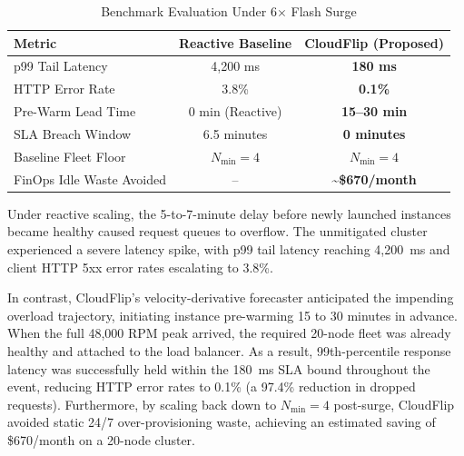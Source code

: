 \documentclass[10pt,journal,compsoc]{IEEEtran}
\begin{document}
\begin{table}[h]
\caption{Benchmark Evaluation Under 6$\times$ Flash Surge}
\label{tab:evaluation}
\centering
\begin{tabular}{lcc}
\toprule
\textbf{Metric} & \textbf{Reactive Baseline} & \textbf{CloudFlip (Proposed)} \\
\midrule
p99 Tail Latency & 4,200 ms & \textbf{180 ms} \\
HTTP Error Rate & 3.8\% & \textbf{0.1\%} \\
Pre-Warm Lead Time & 0 min (Reactive) & \textbf{15--30 min} \\
SLA Breach Window & 6.5 minutes & \textbf{0 minutes} \\
Baseline Fleet Floor & $N_{\min} = 4$ & $N_{\min} = 4$ \\
FinOps Idle Waste Avoided & -- & \textbf{\~{}\$670/month} \\
\bottomrule
\end{tabular}
\end{table}

Under reactive scaling, the 5-to-7-minute delay before newly launched instances became healthy caused request queues to overflow. The unmitigated cluster experienced a severe latency spike, with p99 tail latency reaching 4,200~ms and client HTTP 5xx error rates escalating to 3.8\%.

In contrast, CloudFlip's velocity-derivative forecaster anticipated the impending overload trajectory, initiating instance pre-warming 15 to 30 minutes in advance. When the full 48,000 RPM peak arrived, the required 20-node fleet was already healthy and attached to the load balancer. As a result, 99th-percentile response latency was successfully held within the 180~ms SLA bound throughout the event, reducing HTTP error rates to 0.1\% (a 97.4\% reduction in dropped requests). Furthermore, by scaling back down to $N_{\min} = 4$ post-surge, CloudFlip avoided static 24/7 over-provisioning waste, achieving an estimated saving of \$670/month on a 20-node cluster.
\end{document}
